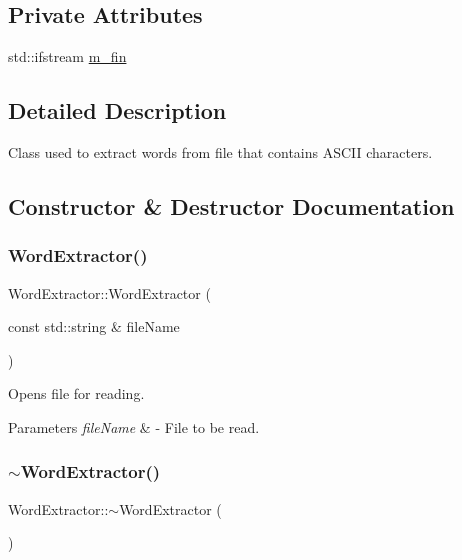 \subsection*{Private Attributes}
\begin{DoxyCompactItemize}
\item 
std\+::ifstream \mbox{\hyperlink{class_word_extractor_af189c1c3a30c9e06d5bda3ac358d0963}{m\+\_\+fin}}
\end{DoxyCompactItemize}


\subsection{Detailed Description}
Class used to extract words from file that contains A\+S\+C\+II characters. 

\subsection{Constructor \& Destructor Documentation}
\mbox{\label{class_word_extractor_ad49ed8d220bc9cd36f3b0a285d52a081}} 
\subsubsection{\texorpdfstring{Word\+Extractor()}{WordExtractor()}}
{\footnotesize\ttfamily Word\+Extractor\+::\+Word\+Extractor (\begin{DoxyParamCaption}\item[{const std\+::string \&}]{file\+Name }\end{DoxyParamCaption})}

Opens file for reading. 
\begin{DoxyParams}{Parameters}
{\em file\+Name} & -\/ File to be read. \\
\hline
\end{DoxyParams}
\mbox{\label{class_word_extractor_a20476de5cb146afd9bc318a629157a9c}} 
\subsubsection{\texorpdfstring{$\sim$\+Word\+Extractor()}{~WordExtractor()}}
{\footnotesize\ttfamily Word\+Extractor\+::$\sim$\+Word\+Extractor (\begin{DoxyParamCaption}{ }\end{DoxyParamCaption})}

